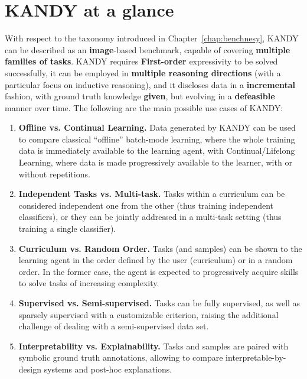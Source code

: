 \section{\textsc{KANDY} at a glance}%
With respect to the taxonomy introduced in Chapter~\ref{chap:benchnesy}, \textsc{KANDY} can be described as an \textbf{image}-based benchmark, capable of covering \textbf{multiple families of tasks}. \textsc{KANDY} requires \textbf{First-order} expressivity to be solved successfully, it can be employed in \textbf{multiple reasoning directions} (with a particular focus on inductive reasoning), and it discloses data in a \textbf{incremental} fashion, with ground truth knowledge \textbf{given}, but evolving in a \textbf{defeasible} manner over time. 
The following are the main possible use cases of \textsc{KANDY}:
%
\begin{enumerate}
    \item \textbf{Offline vs. Continual Learning.} Data generated by \textsc{KANDY} can be used to compare classical ``offline'' batch-mode learning, where the whole training data is immediately available to the learning agent, with Continual/Lifelong Learning, where data is made progressively available to the learner, with or without repetitions.
    \item \textbf{Independent Tasks vs. Multi-task.} Tasks within a curriculum can be considered independent one from the other (thus training independent classifiers), or they can be jointly addressed in a multi-task setting (thus training a single classifier).%
    \item \textbf{Curriculum vs. Random Order.} Tasks (and samples) can be shown to the learning agent in the order defined by the user (curriculum) or in a random order. In the former case, the agent is expected to progressively acquire skills to solve tasks of increasing complexity.
    \item \textbf{Supervised vs. Semi-supervised.} Tasks can be fully supervised, as well as sparsely supervised with a customizable criterion, raising the additional challenge of dealing with a semi-supervised data set.
    \item \textbf{Interpretability vs. Explainability.} Tasks and samples are paired with symbolic ground truth annotations, allowing to compare interpretable-by-design systems and post-hoc explanations.%
\end{enumerate}
